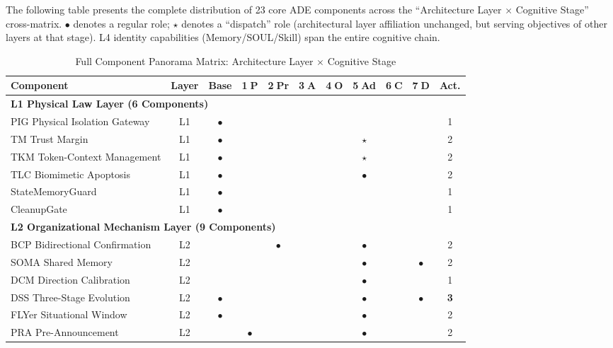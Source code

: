 \documentclass[11pt,a4paper]{article}
\begin{document}
The following table presents the complete distribution of 23 core ADE components across the ``Architecture Layer $\times$ Cognitive Stage'' cross-matrix. $\bullet$ denotes a regular role; $\star$ denotes a ``dispatch'' role (architectural layer affiliation unchanged, but serving objectives of other layers at that stage). L4 identity capabilities (Memory/SOUL/Skill) span the entire cognitive chain.

\begin{table}[htbp]
\centering
\caption{Full Component Panorama Matrix: Architecture Layer $\times$ Cognitive Stage}
\label{tab:panorama}
\footnotesize
\begin{tabular}{p{}cccccccccc}
\hline
\textbf{Component} & \textbf{Layer} & \textbf{Base} & \textbf{\textcircled{1}P} & \textbf{\textcircled{2}Pr} & \textbf{\textcircled{3}A} & \textbf{\textcircled{4}O} & \textbf{\textcircled{5}Ad} & \textbf{\textcircled{6}C} & \textbf{\textcircled{7}D} & \textbf{Act.} \\
\hline
\multicolumn{11}{l}{\textbf{L1 Physical Law Layer (6 Components)}} \\
\hline
PIG Physical Isolation Gateway & L1 & $\bullet$ & & & & & & & & 1 \\
TM Trust Margin & L1 & $\bullet$ & & & & & $\star$ & & & 2 \\
TKM Token-Context Management & L1 & $\bullet$ & & & & & $\star$ & & & 2 \\
TLC Biomimetic Apoptosis & L1 & $\bullet$ & & & & & $\bullet$ & & & 2 \\
StateMemoryGuard & L1 & $\bullet$ & & & & & & & & 1 \\
CleanupGate & L1 & $\bullet$ & & & & & & & & 1 \\
\hline
\multicolumn{11}{l}{\textbf{L2 Organizational Mechanism Layer (9 Components)}} \\
\hline
BCP Bidirectional Confirmation & L2 & & & $\bullet$ & & & $\bullet$ & & & 2 \\
SOMA Shared Memory & L2 & & & & & & $\bullet$ & & $\bullet$ & 2 \\
DCM Direction Calibration & L2 & & & & & & $\bullet$ & & & 1 \\
DSS Three-Stage Evolution & L2 & $\bullet$ & & & & & $\bullet$ & & $\bullet$ & \textbf{3} \\
FLYer Situational Window & L2 & $\bullet$ & & & & & $\bullet$ & & & 2 \\
PRA Pre-Announcement & L2 & & $\bullet$ & & & & $\bullet$ & & & 2 \\

\end{tabular}
\end{table}
\end{document}
